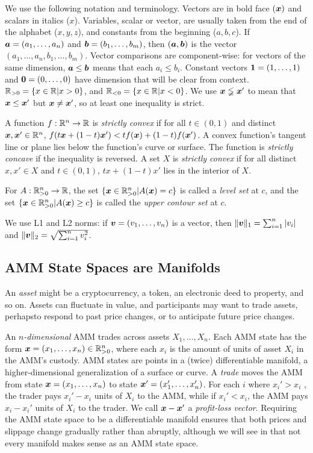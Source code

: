 We use the following notation and terminology.
Vectors are in bold face $({\boldsymbol x})$ and scalars in italics ($x$).
Variables, scalar or vector,
are usually taken from the end of the alphabet ($x,y,z$),
and constants from the beginning ($a,b,c$).
If ${\boldsymbol a} = (a_1, \ldots, a_n)$ and
${\boldsymbol b} = (b_1, \ldots, b_m)$,
then $({\boldsymbol a},{\boldsymbol b})$ is the vector $(a_1, \ldots, a_n, b_1, \ldots, b_m)$.
Vector comparisons are component-wise:
for vectors of the same dimension,
${\boldsymbol a} \leq {\boldsymbol b}$ means that each $a_i \leq b_i$.
Constant vectors
${\boldsymbol 1} = (1, \ldots, 1)$ and ${\boldsymbol 0} = (0, \ldots, 0)$ have dimension that will be clear from context.
$\mathbb{R}_{>0} = \left\{ x \in \mathbb{R} | x > 0 \right\}$,
and $\mathbb{R}_{<0} = \left\{ x \in \mathbb{R} | x < 0 \right\}$.
We use ${\boldsymbol x} \lneqq {\boldsymbol x}'$ to mean that ${\boldsymbol x} \leq {\boldsymbol x}'$ but ${\boldsymbol x} \neq {\boldsymbol x}'$,
so at least one inequality is strict.

A function $f: \mathbb{R}^n \to \mathbb{R}$ is \emph{strictly convex}
if for all $t \in (0,1)$ and distinct ${\boldsymbol x},{\boldsymbol x}' \in \mathbb{R}^n$,
$f(t {\boldsymbol x} + (1-t) {\boldsymbol x}') < tf({\boldsymbol x}) + (1-t)f({\boldsymbol x}')$.
A convex function's tangent line or plane lies below the function's curve or surface.
The function is \emph{strictly concave} if the inequality is reversed.
A set $X$ is \emph{strictly convex} if for all distinct
$x,x' \in X$ and $t \in (0,1)$,
$t x + (1-t) x'$ lies in the interior of $X$.

For $A: \mathbb{R}_{>0}^n \to \mathbb{R}$,
the set $\left\{ {\boldsymbol x} \in \mathbb{R}_{>0}^n | A({\boldsymbol x}) = c \right\}$ is called a \emph{level set} at $c$,
and the set $\left\{ {\boldsymbol x} \in \mathbb{R}_{>0}^n | A({\boldsymbol x}) \geq c \right\}$
is called the \emph{upper contour set} at $c$.

We use L1 and L2 norms: if ${\boldsymbol v} = (v_1, \ldots, v_n)$ is a vector,
then $\|{\boldsymbol v}\|_1 = \sum_{i=1}^n |v_i|$ and 
$\|{\boldsymbol v}\|_2 = \sqrt{\sum_{i=1}^n v_i^2}$.

\subsection{AMM State Spaces are Manifolds}
An \emph{asset} might be a cryptocurrency, a token,
an electronic deed to property, and so on.
Assets can fluctuate in value,
and participants may want to trade assets,
perhapsto respond to past price changes,
or to anticipate future price changes.

An \emph{$n$-dimensional} AMM trades across assets $X_1, \ldots, X_n$.
Each AMM state has the form ${\boldsymbol x} = (x_1,\ldots,x_n) \in \mathbb{R}_{>0}^n$,
where each $x_i$ is the amount of units of asset $X_i$ in the AMM's custody.
AMM states are points in a (twice) differentiable manifold,
a higher-dimensional generalization of a surface or curve.
A \emph{trade} moves the AMM from state
${\boldsymbol x} = (x_1,\ldots,x_n)$ to state ${\boldsymbol x}' = (x_1',\ldots,x_n')$.
For each $i$ where $x_i' > x_i$ ,
the trader pays $x_i'-x_i$ units of $X_i$ to the AMM,
while if $x_i' < x_i$,
the AMM pays $x_i-x_i'$ units of $X_i$ to the trader.
We call ${\boldsymbol x}-{\boldsymbol x}'$ a \emph{profit-loss vector}.
Requiring the AMM state space to be a differentiable manifold ensures that
both prices and slippage change gradually rather than abruptly,
although we will see in  that not every manifold makes sense as an AMM state space.

